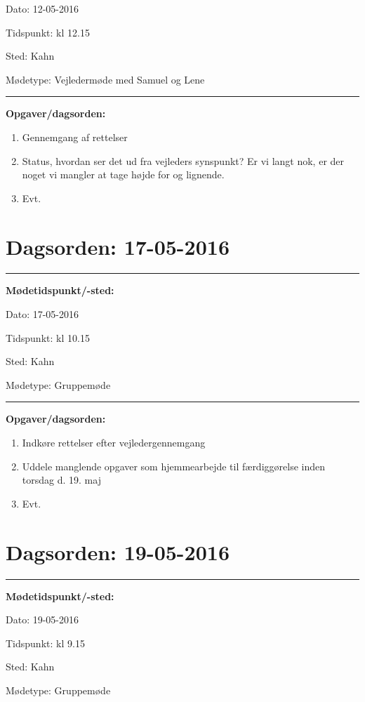 Dato: \tabto{7em} 12-05-2016

Tidspunkt: \tabto{7em} kl 12.15

Sted: \tabto{7em} Kahn 

Mødetype: \tabto{7em} Vejledermøde med Samuel og Lene \newline


\hrule
\textbf{Opgaver/dagsorden:} \newline
\begin{enumerate}
	\item Gennemgang af rettelser
	\item Status, hvordan ser det ud fra vejleders synspunkt? Er vi langt nok, er der noget vi mangler at tage højde for og lignende. 
	\item Evt. 
\end{enumerate}

\section{Dagsorden: 17-05-2016 }
\hrule
\textbf{Mødetidspunkt/-sted:} 

Dato: \tabto{7em} 17-05-2016

Tidspunkt: \tabto{7em} kl 10.15

Sted: \tabto{7em} Kahn 

Mødetype: \tabto{7em} Gruppemøde \newline


\hrule
\textbf{Opgaver/dagsorden:} \newline
\begin{enumerate}
	\item Indkøre rettelser efter vejledergennemgang
	\item Uddele manglende opgaver som hjemmearbejde til færdiggørelse inden torsdag d. 19. maj
	\item Evt. 
\end{enumerate}

\newpage
\section{Dagsorden: 19-05-2016 }
\hrule
\textbf{Mødetidspunkt/-sted:} 

Dato: \tabto{7em} 19-05-2016

Tidspunkt: \tabto{7em} kl 9.15

Sted: \tabto{7em} Kahn 

Mødetype: \tabto{7em} Gruppemøde \newline


